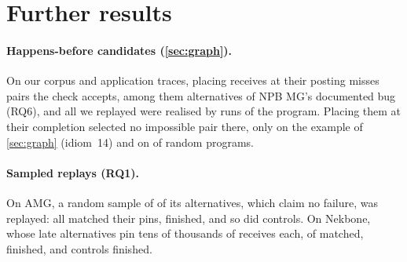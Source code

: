 \section{Further results}
\label{app:apps}

\paragraph{Happens-before candidates (\cref{sec:graph}).} On our \nHBTraces corpus and
application traces, placing receives at their posting misses \nHBPostMissed pairs the check
accepts, among them \nHBMGPostMissed alternatives of NPB MG's documented bug (RQ6), and all
\nHBReplayStrettoOnly we replayed were realised by runs of the program. Placing them at their
completion selected no impossible pair there, only on the example of \cref{sec:graph}
(idiom~14) and on \nHBSynCompOnlyNotRealised of \nHBSynPrograms random programs.

\paragraph{Sampled replays (RQ1).} On AMG, a random sample of \nAMGsample of its alternatives,
which claim no failure, was replayed: all \nAMGsampleMatched matched their pins,
\nAMGsampleFinish finished, and so did \nAMGsampleControls controls. On Nekbone, whose late
alternatives pin tens of thousands of receives each, \nNeksampleMatched of \nNeksample matched,
\nNeksampleFinish finished, and \nNeksampleControls controls finished.

